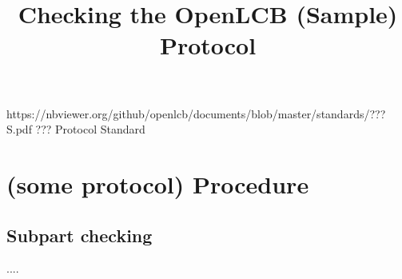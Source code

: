 

\title{Checking the OpenLCB (Sample) Protocol}


\maketitle


\introductionCaveats
    {https://nbviewer.org/github/openlcb/documents/blob/master/standards/???S.pdf}
    {??? Protocol Standard}


\section{(some protocol) Procedure}


\subsection{Subpart checking}

....


  
